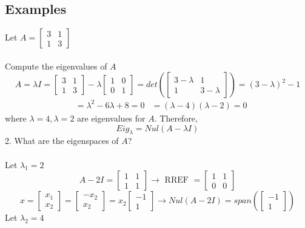 \begin{enumerate}
\subsection{Examples}
Let $A = \begin{bmatrix} 3 & 1 \\ 1 & 3 
\end{bmatrix}$ \\\\
Compute the eigenvalues of $A$
\[
  A = \lambda I = \begin{bmatrix} 3 & 1 \\ 1 & 3 \end{bmatrix} 
  - \lambda \begin{bmatrix} 1 & 0 \\ 0 & 1 \end{bmatrix} = 
  det(\begin{bmatrix} 3 - \lambda & 1 \\ 1 & 3 - 
  \lambda \end{bmatrix}) = (3 - \lambda)^2 - 1 
\]
\[
  \begin{aligned}
    &= \lambda^2 - 6\lambda + 8 = 0
    &= (\lambda - 4)(\lambda - 2) = 0
  \end{aligned}
\] where $\lambda = 4, \lambda = 2$ are eigenvalues for $A$. Therefore, 
\[
  Eig_\lambda = Nul(A - \lambda I)
\]
2. What are the eigenspaces of $A$? \\\\
Let $\lambda_1 = 2$
\[
  A - 2I = \begin{bmatrix} 1 & 1 \\ 1 & 1 \end{bmatrix} \rightarrow 
  \text{ RREF } = \begin{bmatrix} 1 & 1 \\ 0 & 0 \end{bmatrix}
\]
\[
  x = \begin{bmatrix} x_1 \\ x_2 \end{bmatrix} = \begin{bmatrix}
  -x_2 \\ x_2 \end{bmatrix} = x_2 \begin{bmatrix} -1 \\ 1 \end{bmatrix}
  \rightarrow Nul(A - 2I) = span(\begin{bmatrix} -1 \\ 1 \end{bmatrix})
\]
Let $\lambda_2 = 4$

\end{enumerate}
